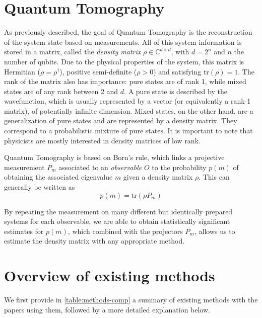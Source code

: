 \documentclass[12pt]{memoir}
\newcommand{\tr}{\text{tr}}
\begin{document}
\section{Quantum Tomography} \label{introduction:quantum-tomography}


As previously described, the goal of Quantum Tomography is the reconstruction of the system state based on measurements. All of this system information is stored in a matrix, called the \textit{density matrix} $\rho \in \mathbb{C}^{d \times d}$, with $d = 2^n$ and $n$ the number of qubits. Due to the physical properties of the system, this matrix is Hermitian ($\rho = \rho^{\dagger}$), positive semi-definite ($\rho > 0$) and satisfying $\tr(\rho) = 1$. The rank of the matrix also has importance: pure states are of rank 1, while mixed states are of any rank between 2 and $d$. A pure state is described by the wavefunction, which is usually represented by a vector (or equivalently a rank-1 matrix), of potentially infinite dimension. Mixed states, on the other hand, are a generalization of pure states and are represented by a density matrix. They correspond to a probabilistic mixture of pure states. It is important to note that physicists are mostly interested in density matrices of low rank.\medbreak


Quantum Tomography is based on Born's rule, which links a projective measurement $P_m$ associated to an \textit{observable} $O$ to the probability $p(m)$ of obtaining the associated eigenvalue $m$ given a density matrix $\rho$. This can generally be written as
\begin{equation}
    p(m) = \tr(\rho P_m)
\end{equation}

By repeating the measurement on many different but identically prepared systems for each observable, we are able to obtain statistically significant estimates for $p(m)$, which combined with the projectors $P_m$, allows us to estimate the density matrix with any appropriate method.

\section{Overview of existing methods}\label{section:litterature-review}

We first provide in \ref{table:methods-comp} a summary of existing methods with the papers using them, followed by a more detailed explanation below.  
\end{document}
